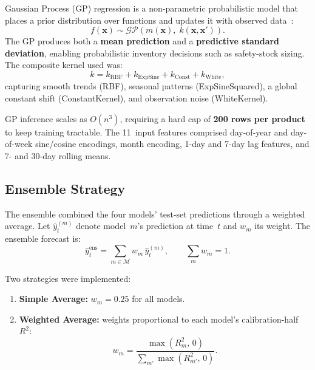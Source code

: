 \documentclass[12pt, a4paper]{article}
\begin{document}
Gaussian Process (GP) regression is a non-parametric probabilistic model that places a
prior distribution over functions and updates it with observed data~\cite{rasmussen2006}:
\begin{equation}
    f(\mathbf{x}) \sim \mathcal{GP}\!\left(m(\mathbf{x}),\; k(\mathbf{x}, \mathbf{x}')\right).
    \label{eq:gp}
\end{equation}
The GP produces both a \textbf{mean prediction} and a \textbf{predictive standard
deviation}, enabling probabilistic inventory decisions such as safety-stock sizing. The
composite kernel used was:
\begin{equation}
    k = k_{\mathrm{RBF}} + k_{\mathrm{ExpSine}} + k_{\mathrm{Const}} + k_{\mathrm{White}},
    \label{eq:kernel}
\end{equation}
capturing smooth trends (RBF), seasonal patterns (ExpSineSquared), a global constant
shift (ConstantKernel), and observation noise (WhiteKernel).

GP inference scales as $O(n^{3})$, requiring a hard cap of \textbf{200 rows per product}
to keep training tractable. The 11~input features comprised day-of-year and day-of-week
sine/cosine encodings, month encoding, 1-day and 7-day lag features, and 7- and 30-day
rolling means.

\subsection{Ensemble Strategy}
\label{subsec:ensemble}

The ensemble combined the four models' test-set predictions through a weighted average.
Let $\hat{y}^{(m)}_{t}$ denote model~$m$'s prediction at time~$t$ and $w_m$ its weight.
The ensemble forecast is:
\begin{equation}
    \hat{y}^{\mathrm{ens}}_{t} = \sum_{m \in \mathcal{M}} w_m\, \hat{y}^{(m)}_{t},
    \qquad \sum_{m} w_m = 1.
    \label{eq:ensemble}
\end{equation}

Two strategies were implemented:
\begin{enumerate}[leftmargin=*, label=(\roman*)]
    \item \textbf{Simple Average:} $w_m = 0.25$ for all models.
    \item \textbf{Weighted Average:} weights proportional to each model's calibration-half
          $R^{2}$:
          \begin{equation}
              w_m = \frac{\max(R^{2}_m,\, 0)}{\displaystyle\sum_{m'} \max(R^{2}_{m'},\, 0)}.
              \label{eq:weights}
          \end{equation}
\end{enumerate}
\end{document}
